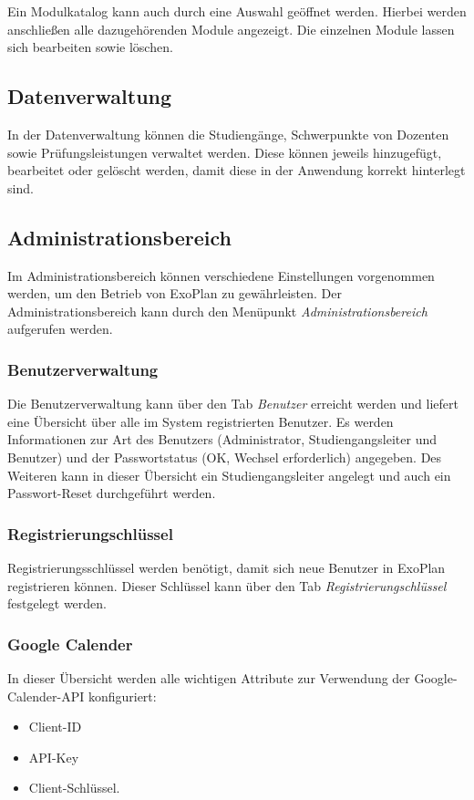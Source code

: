 Ein Modulkatalog kann auch durch eine Auswahl geöffnet werden. 
Hierbei werden anschließen alle dazugehörenden Module angezeigt. 
Die einzelnen Module lassen sich bearbeiten sowie löschen.

\subsection{Datenverwaltung}

In der Datenverwaltung können die Studiengänge, Schwerpunkte von Dozenten sowie Prüfungsleistungen verwaltet werden.
Diese können jeweils hinzugefügt, bearbeitet oder gelöscht werden, damit diese in der Anwendung korrekt hinterlegt sind.

\subsection{Administrationsbereich}

Im Administrationsbereich können verschiedene Einstellungen vorgenommen werden, um den Betrieb von ExoPlan zu gewährleisten. 
Der Administrationsbereich kann durch den Menüpunkt \textit{Administrationsbereich} aufgerufen werden.

\subsubsection{Benutzerverwaltung}

Die Benutzerverwaltung kann über den Tab \textit{Benutzer} erreicht werden und liefert eine Übersicht über alle im System registrierten Benutzer. 
Es werden Informationen zur Art des Benutzers (Administrator, Studiengangsleiter und Benutzer) und der Passwortstatus (OK, Wechsel erforderlich) angegeben. 
Des Weiteren kann in dieser Übersicht ein Studiengangsleiter angelegt und auch ein Passwort-Reset durchgeführt werden.

\subsubsection{Registrierungschlüssel}

Registrierungsschlüssel werden benötigt, damit sich neue Benutzer in ExoPlan registrieren können. 
Dieser Schlüssel kann über den Tab \textit{Registrierungschlüssel} festgelegt werden.

\subsubsection{Google Calender}

In dieser Übersicht werden alle wichtigen Attribute zur Verwendung der Google-Calender-\ac{API} konfiguriert:
\begin{itemize}
	\item Client-ID
	\item \ac{API}-Key
	\item Client-Schlüssel.
\end{itemize}
